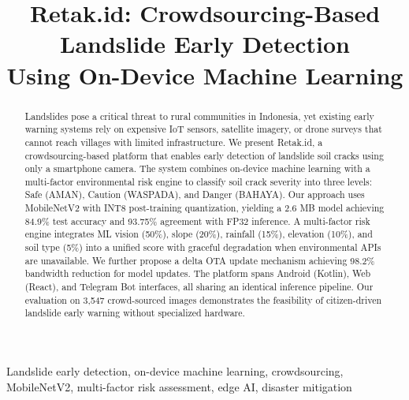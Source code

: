 \documentclass[conference]{IEEEtran}
\begin{document}
\title{Retak.id: Crowdsourcing-Based Landslide Early Detection\\Using On-Device Machine Learning}

\author{
}

\maketitle

\begin{abstract}
	Landslides pose a critical threat to rural communities in Indonesia, yet existing early warning systems rely on expensive IoT sensors, satellite imagery, or drone surveys that cannot reach villages with limited infrastructure. We present Retak.id, a crowdsourcing-based platform that enables early detection of landslide soil cracks using only a smartphone camera. The system combines on-device machine learning with a multi-factor environmental risk engine to classify soil crack severity into three levels: Safe (AMAN), Caution (WASPADA), and Danger (BAHAYA). Our approach uses MobileNetV2 with INT8 post-training quantization, yielding a 2.6 MB model achieving 84.9\% test accuracy and 93.75\% agreement with FP32 inference. A multi-factor risk engine integrates ML vision (50\%), slope (20\%), rainfall (15\%), elevation (10\%), and soil type (5\%) into a unified score with graceful degradation when environmental APIs are unavailable. We further propose a delta OTA update mechanism achieving 98.2\% bandwidth reduction for model updates. The platform spans Android (Kotlin), Web (React), and Telegram Bot interfaces, all sharing an identical inference pipeline. Our evaluation on 3,547 crowd-sourced images demonstrates the feasibility of citizen-driven landslide early warning without specialized hardware.
\end{abstract}

\begin{IEEEkeywords}
	Landslide early detection, on-device machine learning, crowdsourcing, MobileNetV2, multi-factor risk assessment, edge AI, disaster mitigation
\end{IEEEkeywords}
\end{document}

